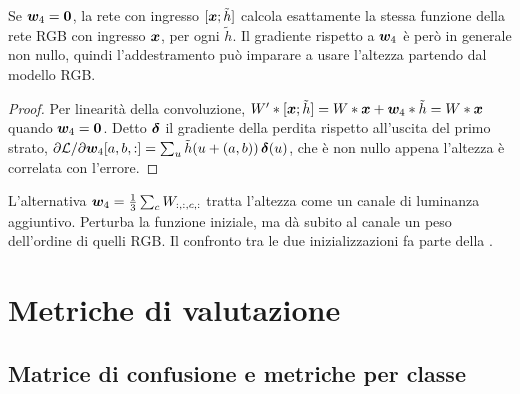 \begin{proposizione}
\label{prop:inflazione}
Se $\bm{w}_4=\bm{0}$, la rete con ingresso $[\bm{x};\tilde h]$ calcola esattamente la
stessa funzione della rete RGB con ingresso $\bm{x}$, per ogni $\tilde h$. Il gradiente
rispetto a $\bm{w}_4$ è però in generale non nullo, quindi l'addestramento può imparare a
usare l'altezza partendo dal modello RGB.
\end{proposizione}
\begin{proof}
Per linearità della convoluzione,
$W'*[\bm{x};\tilde h]=W*\bm{x}+\bm{w}_4*\tilde h=W*\bm{x}$ quando $\bm{w}_4=\bm{0}$.
Detto $\bm{\delta}$ il gradiente della perdita rispetto all'uscita del primo strato,
$\partial\mathcal{L}/\partial\bm{w}_4[a,b,:]=\sum_u\tilde h(u+(a,b))\,\bm{\delta}(u)$, che è
non nullo appena l'altezza è correlata con l'errore.
\end{proof}

L'alternativa $\bm{w}_4=\frac13\sum_cW_{:,:,c,:}$ tratta l'altezza come un canale di luminanza
aggiuntivo. Perturba la funzione iniziale, ma dà subito al canale un peso dell'ordine di quelli
RGB. Il confronto tra le due inizializzazioni fa parte della .

\section{Metriche di valutazione}
\label{sec:metriche}

\subsection{Matrice di confusione e metriche per classe}

